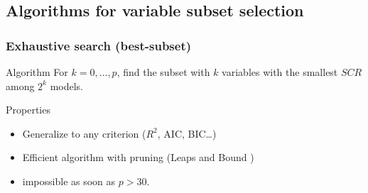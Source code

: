 \documentclass[10pt, c, xcolor=x11names]{beamer}\usepackage[]{graphicx}\usepackage[]{color}
\begin{document}
% 
% 
% 

\subsection{Algorithms for variable subset selection}

\begin{frame}
  \frametitle{Exhaustive search  (best-subset)}

  \begin{block}{Algorithm}
    For $k=0,\dots,p$,  find the subset with  $k$ variables with the smallest  $SCR$ among $2^k$ models.
  \end{block}
  
  \vfill
  
  \begin{block}{Properties}
    \begin{itemize}
    \item Generalize to any criterion ($R^2$, AIC, BIC\dots)
    \item Efficient algorithm with pruning  (\og Leaps and Bound \fg)
    \item impossible as soon as $p>30$.
    \end{itemize}
  \end{block}
\end{frame}
\end{document}
